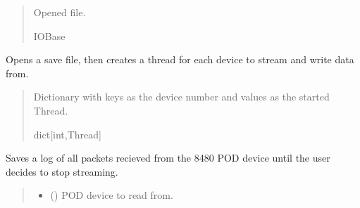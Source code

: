 \documentclass[letterpaper,10pt,english]{sphinxmanual}
\begin{document}
\begin{fulllineitems}
\begin{fulllineitems}
\begin{quote}
\begin{description}
\sphinxAtStartPar
Opened file.

\sphinxAtStartPar
IOBase

\end{description}\end{quote}

\end{fulllineitems}


\begin{fulllineitems}
\label{\detokenize{Setup_8480SC:Setup_8480SC.Setup_8480SC._StreamThreading}}
\pysigstartsignatures
{}
\pysigstopsignatures
\sphinxAtStartPar
Opens a save file, then creates a thread for each device to stream and write         data from.
\begin{quote}\begin{description}
\sphinxAtStartPar
Dictionary with keys as the device number and values as the                 started Thread.

\sphinxAtStartPar
dict{[}int,Thread{]}

\end{description}\end{quote}

\end{fulllineitems}


\begin{fulllineitems}
\label{\detokenize{Setup_8480SC:Setup_8480SC.Setup_8480SC._StreamUntilStop}}
\pysigstartsignatures
{}
\pysigstopsignatures
\sphinxAtStartPar
Saves a log of all packets recieved from the 8480 POD device until the user decides         to stop streaming.
\begin{quote}\begin{description}
\begin{itemize}
\item {} 
\sphinxAtStartPar
{} () \textendash{} POD device to read from.


\end{itemize}
\end{description}
\end{quote}
\end{fulllineitems}
\end{fulllineitems}
\end{document}
